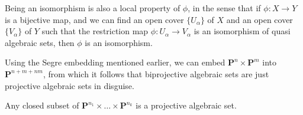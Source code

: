 \begin{remark}
    Being an isomorphism is also a local property of $\phi$, in the sense that if $\phi: X \to Y$ is a bijective map, and we can find an open cover $\{ U_\alpha \}$ of $X$ and an open cover $\{ V_\alpha \}$ of $Y$ such that the restriction map $\phi: U_\alpha \to V_\alpha$ is an isomorphism of quasi algebraic sets, then $\phi$ is an isomorphism.
\end{remark}

Using the Segre embedding mentioned earlier, we can embed $\mathbf{P}^n \times \mathbf{P}^m$ into $\mathbf{P}^{n + m + nm}$, from which it follows that biprojective algebraic sets are just projective algebraic sets in disguise.

\begin{theorem}
    Any closed subset of $\mathbf{P}^{n_1} \times \dots \times \mathbf{P}^{n_k}$ is a projective algebraic set.
\end{theorem}
